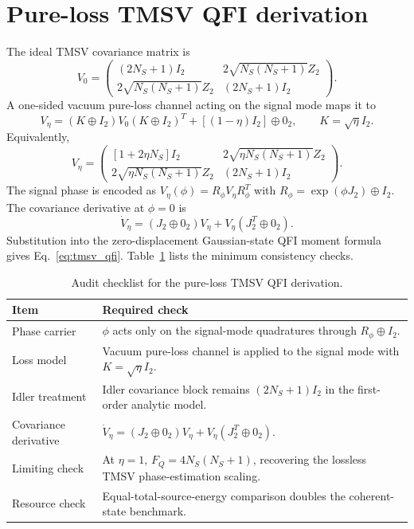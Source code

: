 \documentclass[a4paper,11pt]{article}
\numberwithin{equation}{section}
\newcommand{\Ns}{N_{S}}
\begin{document}
\section{Pure-loss TMSV QFI derivation}
\label{app:qfi}

The ideal TMSV covariance matrix is
\begin{equation}
V_0=\begin{pmatrix}
(2\Ns+1)I_2 & 2\sqrt{\Ns(\Ns+1)}Z_2\\
2\sqrt{\Ns(\Ns+1)}Z_2 & (2\Ns+1)I_2
\end{pmatrix}.
\end{equation}
A one-sided vacuum pure-loss channel acting on the signal mode maps it to
\begin{equation}
V_\eta=(K\oplus I_2)V_0(K\oplus I_2)^T+[(1-\eta)I_2]\oplus 0_2,
\qquad K=\sqrt{\eta}I_2.
\end{equation}
Equivalently,
\begin{equation}
V_\eta=\begin{pmatrix}
[1+2\eta\Ns]I_2 & 2\sqrt{\eta\Ns(\Ns+1)}Z_2\\
2\sqrt{\eta\Ns(\Ns+1)}Z_2 & (2\Ns+1)I_2
\end{pmatrix}.
\end{equation}
The signal phase is encoded as $V_\eta(\phi)=R_\phi V_\eta R_\phi^T$ with $R_\phi=\exp(\phi J_2)\oplus I_2$. The covariance derivative at $\phi=0$ is
\begin{equation}
  \dot V_\eta=(J_2\oplus0_2)V_\eta+V_\eta(J_2^T\oplus0_2).
\end{equation}
Substitution into the zero-displacement Gaussian-state QFI moment formula gives Eq.~\eqref{eq:tmsv_qfi}. Table~\ref{tab:qfi_audit} lists the minimum consistency checks.

\begin{table}[htbp]
\centering
\caption{Audit checklist for the pure-loss TMSV QFI derivation.}
\label{tab:qfi_audit}
\small
\begin{tabularx}{\textwidth}{l X}
\toprule
Item & Required check \\
\midrule
Phase carrier & $\phi$ acts only on the signal-mode quadratures through $R_\phi\oplus I_2$. \\
Loss model & Vacuum pure-loss channel is applied to the signal mode with $K=\sqrt{\eta}I_2$. \\
Idler treatment & Idler covariance block remains $(2\Ns+1)I_2$ in the first-order analytic model. \\
Covariance derivative & $\dot V_\eta=(J_2\oplus0_2)V_\eta+V_\eta(J_2^T\oplus0_2)$. \\
Limiting check & At $\eta=1$, $F_Q=4\Ns(\Ns+1)$, recovering the lossless TMSV phase-estimation scaling. \\
Resource check & Equal-total-source-energy comparison doubles the coherent-state benchmark. \\
\bottomrule
\end{tabularx}
\end{table}
\end{document}
